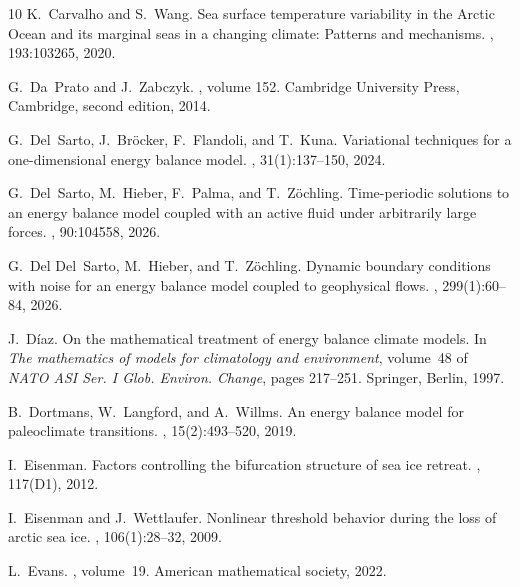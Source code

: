 \documentclass[10pt]{amsart}
\numberwithin{equation}{section}
\begin{document}
\begin{thebibliography}{10}
K.~Carvalho and S.~Wang.
\newblock Sea surface temperature variability in the {A}rctic {O}cean and its
  marginal seas in a changing climate: {P}atterns and mechanisms.
, 193:103265, 2020.

G.~Da~Prato and J.~Zabczyk.
, volume 152.
\newblock Cambridge University Press, Cambridge, second edition, 2014.

G.~Del~Sarto, J.~Br\"ocker, F.~Flandoli, and T.~Kuna.
\newblock Variational techniques for a one-dimensional energy balance model.
, 31(1):137--150, 2024.

G.~Del~Sarto, M.~Hieber, F.~Palma, and T.~Z\"ochling.
\newblock Time-periodic solutions to an energy balance model coupled with an
  active fluid under arbitrarily large forces.
, 90:104558, 2026.

G.~Del Del~Sarto, M.~Hieber, and T.~Z\"ochling.
\newblock Dynamic boundary conditions with noise for an energy balance model
  coupled to geophysical flows.
, 299(1):60--84, 2026.

J.~D\'iaz.
\newblock On the mathematical treatment of energy balance climate models.
\newblock In {\em The mathematics of models for climatology and environment},
  volume~48 of {\em NATO ASI Ser. I Glob. Environ. Change}, pages 217--251.
  Springer, Berlin, 1997.

B.~Dortmans, W.~Langford, and A.~Willms.
\newblock An energy balance model for paleoclimate transitions.
, 15(2):493--520, 2019.

I.~Eisenman.
\newblock Factors controlling the bifurcation structure of sea ice retreat.
, 117(D1), 2012.

I.~Eisenman and J.~Wettlaufer.
\newblock Nonlinear threshold behavior during the loss of arctic sea ice.
, 106(1):28--32,
  2009.

L.~Evans.
, volume~19.
\newblock American mathematical society, 2022.


\end{thebibliography}
\end{document}
